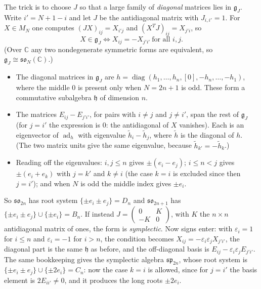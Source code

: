 \documentclass[11pt,openany]{book}
\theoremstyle{plain}
\theoremstyle{definition}
\theoremstyle{remark}
\newcommand{\C}{\mathbb{C}}
\begin{document}
The trick is to choose $J$ so that a large family of \emph{diagonal} matrices lies in $\mathfrak g_J$.
Write $i'=N+1-i$ and let $J$ be the antidiagonal matrix with $J_{i,i'}=1$. For $X\in M_N$ one computes
$(JX)_{ij}=X_{i'j}$ and $(X^TJ)_{ij}=X_{j'i}$, so
\[
  X\in\mathfrak g_J\iff X_{ij}=-X_{j'i'}\ \text{for all } i,j .
\]
(Over $\C$ any two nondegenerate symmetric forms are equivalent, so $\mathfrak g_J\cong\mathfrak{so}_N(\C)$.)
\begin{itemize}
\item The diagonal matrices in $\mathfrak g_J$ are
  $h=\operatorname{diag}(h_1,\dots,h_n,[0],-h_n,\dots,-h_1)$, where the middle $0$ is present only when
  $N=2n+1$ is odd. These form a commutative subalgebra $\mathfrak h$ of dimension $n$.
\item The matrices $E_{ij}-E_{j'i'}$, for pairs with $i\neq j$ and $j\neq i'$, span the rest of
  $\mathfrak g_J$ (for $j=i'$ the expression is $0$: the antidiagonal of $X$ vanishes). Each is
  an eigenvector of $\operatorname{ad}_h$ with eigenvalue $\tilde h_i-\tilde h_j$, where $\tilde h$ is the
  diagonal of $h$. (The two matrix units give the same eigenvalue, because $\tilde h_{k'}=-\tilde h_k$.)
\item Reading off the eigenvalues: $i,j\le n$ gives $\pm(e_i-e_j)$; $i\le n<j$ gives
  $\pm(e_i+e_k)$ with $j=k'$ and $k\neq i$ (the case $k=i$ is excluded since then $j=i'$); and when $N$
  is odd the middle index gives $\pm e_i$.
\end{itemize}
So $\mathfrak{so}_{2n}$ has root system $\{\pm e_i\pm e_j\}=D_n$ and $\mathfrak{so}_{2n+1}$ has
$\{\pm e_i\pm e_j\}\cup\{\pm e_i\}=B_n$. If instead
$J=\left(\begin{smallmatrix}0&K\\-K&0\end{smallmatrix}\right)$, with $K$ the $n\times n$ antidiagonal
matrix of ones, the form is \emph{symplectic}. Now signs enter: with $\varepsilon_i=1$ for $i\le n$
and $\varepsilon_i=-1$ for $i>n$, the condition becomes $X_{ij}=-\varepsilon_i\varepsilon_jX_{j'i'}$, the
diagonal part is the same $\mathfrak h$ as before, and the off-diagonal basis is
$E_{ij}-\varepsilon_i\varepsilon_jE_{j'i'}$. The same bookkeeping gives the symplectic algebra
$\mathfrak{sp}_{2n}$, whose root system is $\{\pm e_i\pm e_j\}\cup\{\pm 2e_i\}=C_n$: now the case $k=i$ is
allowed, since for $j=i'$ the basis element is $2E_{ii'}\neq0$, and it produces the long roots $\pm2e_i$.
\end{document}
